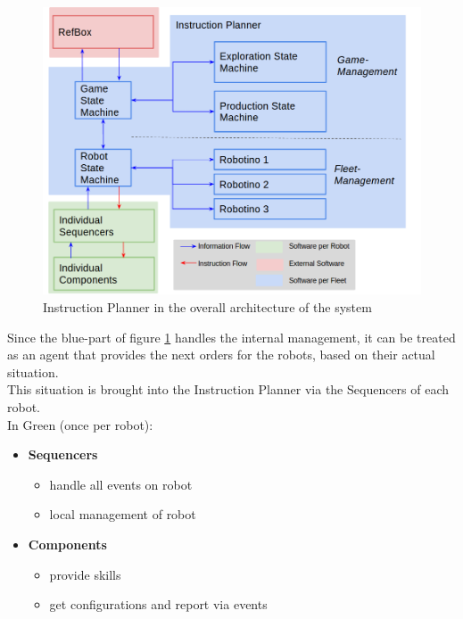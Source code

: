 
\begin{figure}[h]
\centering
\includegraphics[scale=0.4]{pic/Instructionplanner2018.png}
\caption{Instruction Planner in the overall architecture of the system}
\label{fig:instr_overview}
\end{figure}
\newpage

Since the blue-part of figure \ref{fig:instr_overview} handles the internal management, it can be treated as an agent that provides the next orders for the robots, based on their actual situation.\\
This situation is brought into the Instruction Planner via the Sequencers of each
robot.\\
In Green (once per robot): \\
\begin{itemize}
    \item \textbf{Sequencers}
    \begin{itemize}
        \item handle all events on robot
        \item local management of robot
    \end{itemize}
    \item \textbf{Components}
    \begin{itemize}
        \item provide skills
        \item get configurations and report via events
    \end{itemize}
\end{itemize}


